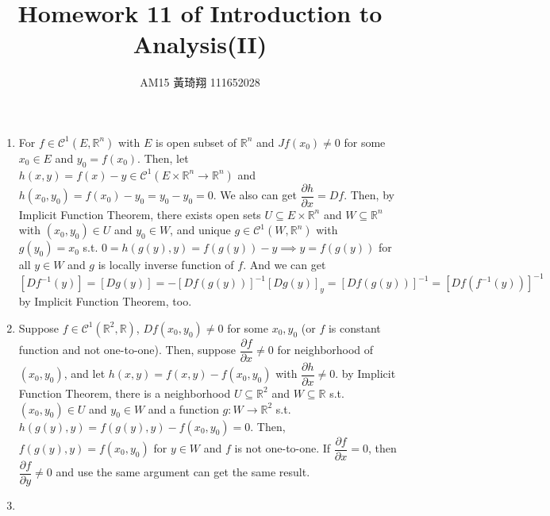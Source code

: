 \documentclass[12pt]{article}
\title{Homework 11 of Introduction to Analysis(II)}
\author{AM15 黃琦翔 111652028}
\begin{document}
\maketitle
\begin{enumerate}
    \item For $f \in \mathcal{C}^1(E, \mathbb{R}^n)$ with $E$ is open subset of $\mathbb{R}^n$ and $Jf(x_0) \neq 0$ for some $x_0\in E$ and $y_0 = f(x_0)$.
    Then, let $h(x, y) = f(x) - y \in \mathcal{C}^1(E\times \mathbb{R}^n \to \mathbb{R}^n)$ and $h(x_0, y_0) = f(x_0) - y_0 = y_0 - y_0 = 0$.
    We also can get $\dfrac{\partial h}{\partial x} = Df$.
    Then, by Implicit Function Theorem, there exists open sets $U \subseteq E\times \mathbb{R}^n$ and $W \subseteq \mathbb{R}^n$ with $(x_0, y_0) \in U$ and $y_0 \in W$,
    and unique $g \in \mathcal{C}^1(W, \mathbb{R}^n)$ with $g(y_0) = x_0$ s.t. $0 = h(g(y), y) = f(g(y)) - y \implies y = f(g(y))$ for all $y \in W$ and $g$ is locally inverse function of $f$.
    And we can get $[Df^{-1}(y)] = [Dg(y)] = - [Df(g(y))]^{-1} [Dg(y)]_y = [Df(g(y))]^{-1} = [Df(f^{-1}(y))]^{-1}$ by Implicit Function Theorem, too.    

    \item Suppose $f \in \mathcal{C}^1(\mathbb{R}^2, \mathbb{R})$, $Df(x_0, y_0) \neq 0$ for some $x_0, y_0$
    (or $f$ is constant function and not one-to-one).
    Then, suppose $\dfrac{\partial f}{\partial x} \neq 0$ for neighborhood of $(x_0, y_0)$,
    and let $h(x, y) = f(x, y) - f(x_0, y_0)$ with $\dfrac{\partial h}{\partial x} \neq 0$.
    by Implicit Function Theorem, there is a neighborhood $U \subseteq \mathbb{R}^2$ and $W \subseteq \mathbb{R}$ s.t. $(x_0, y_0) \in U$ and $y_0 \in W$ 
    and a function $g: W \to \mathbb{R}^2$ s.t. $h(g(y), y) = f(g(y), y) - f(x_0, y_0) = 0$.
    Then, $f(g(y), y) = f(x_0, y_0)$ for $y \in W$ and $f$ is not one-to-one.
    If $\dfrac{\partial f}{\partial x} = 0$, then $\dfrac{\partial f}{\partial y} \neq 0$ and use the same argument can get the same result.

    \item 
    
\end{enumerate}
\end{document}
